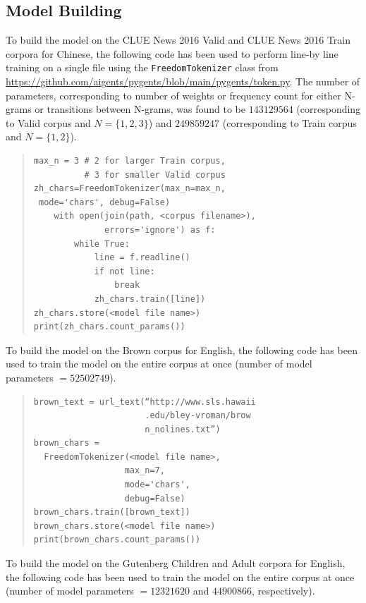 \documentclass[11pt]{article}
\begin{document}
\subsection{Model Building}

To build the model on the CLUE News 2016 Valid and CLUE News 2016 Train corpora for Chinese, the following code has been used to perform line-by line training on a single file using the \texttt{FreedomTokenizer} class from \url{https://github.com/aigents/pygents/blob/main/pygents/token.py}. The number of parameters, corresponding to number of weights or frequency count for either N-grams or transitions between N-grams, was found to be $143129564$ (corresponding to Valid corpus and $N=\{1,2,3\}$) and $249859247$ (corresponding to Train corpus and $N=\{1,2\}$).

\begin{quote}\begin{small}
\begin{verbatim}
max_n = 3 # 2 for larger Train corpus, 
          # 3 for smaller Valid corpus
zh_chars=FreedomTokenizer(max_n=max_n,
 mode='chars', debug=False)
    with open(join(path, <corpus filename>),
              errors='ignore') as f:
        while True:
            line = f.readline()
            if not line:
                break
            zh_chars.train([line])
zh_chars.store(<model file name>)
print(zh_chars.count_params())
\end{verbatim}
\end{small}\end{quote}

To build the model on the Brown corpus for English, the following code has been used to train the model on the entire corpus at once (number of model parameters $= 52502749$).

\begin{quote}\begin{small}
\begin{verbatim}
brown_text = url_text(“http://www.sls.hawaii
                      .edu/bley-vroman/brow
                      n_nolines.txt”)
brown_chars = 
  FreedomTokenizer(<model file name>,
                  max_n=7,
                  mode='chars',
                  debug=False)
brown_chars.train([brown_text])
brown_chars.store(<model file name>)
print(brown_chars.count_params())
\end{verbatim}
\end{small}\end{quote}

To build the model on the Gutenberg Children and Adult corpora for English, the following code has been used to train the model on the entire corpus at once (number of model parameters $= 12321620$ and $44900866$, respectively). 
\end{document}
